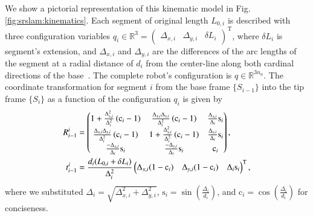 
We show a pictorial representation of this kinematic model in Fig. \ref{fig:srslam:kinematics}. Each segment of original length $L_{0,i}$ is described with three configuration variables 
%
    $q_i \in \mathbb{R}^{3} = \begin{pmatrix}\Delta_{x,i} & \Delta_{y,i} & \delta L_i\end{pmatrix}^\mathrm{T}$,
where $\delta L_i$ is segment's extension, and $\Delta_{x,i}$ and $\Delta_{y,i}$ are the differences of the arc lengths of the segment at a radial distance of $d_i$ from the center-line along both cardinal directions of the base~\cite{della2020improved}. The complete robot's configuration is $q \in \mathbb{R}^{3 n_{\mathrm{S}}}$. The coordinate transformation for segment $i$ from the base frame $\{ S_{i-1} \}$ into the tip frame $\{ S_{i} \}$ as a function of the configuration $q_i$ is given by~\cite{della2020improved}
\begin{equation}
\label{eq:srslam:transformation_improved_pcc}
\begin{split}
    R_{i-1}^{i} &= 
    \begin{pmatrix}
        1 + \frac{\Delta_{x,i}^2}{\Delta_{i}^2} \left ( \mathrm{c}_i - 1 \right ) & \frac{\Delta_{x,i} \Delta_{y,i}}{\Delta_{i}^2} \left ( \mathrm{c}_i - 1 \right ) & \frac{\Delta_{x,i}}{\Delta_i} \mathrm{s}_i\\
        \frac{\Delta_{x,i} \Delta_{y,i}}{\Delta_{i}^2} \left ( \mathrm{c}_i - 1 \right ) & 1 + \frac{\Delta_{y,i}^2}{\Delta_{i}^2} \left ( \mathrm{c}_i - 1 \right ) & \frac{\Delta_{y,i}}{\Delta_i} \mathrm{s}_i\\
        \frac{-\Delta_{x,i}}{\Delta_i} \mathrm{s}_i & \frac{-\Delta_{y,i}}{\Delta_i} \mathrm{s}_i & \mathrm{c}_i
    \end{pmatrix},\\
    \vspace{0.25em}
    t_{i-1}^{i} &= \frac{d_i ( L_{0,i}+\delta L_i)}{\Delta_i^2}
    \begin{pmatrix}
        \Delta_{x,i} (1 - \mathrm{c}_i) & \Delta_{y,i} (1 - \mathrm{c}_i) & \Delta_{i} \mathrm{s}_i
    \end{pmatrix}^{\mathrm{T}},
\end{split}
\end{equation}
where we substituted $\Delta_i = \sqrt{\Delta_{x,i}^2 + \Delta_{y,i}^2}$, $\mathrm{s}_i = \sin \left ( \frac{\Delta_i}{d_i} \right )$, and $\mathrm{c}_i = \cos \left ( \frac{\Delta_i}{d_i} \right )$ for conciseness.

